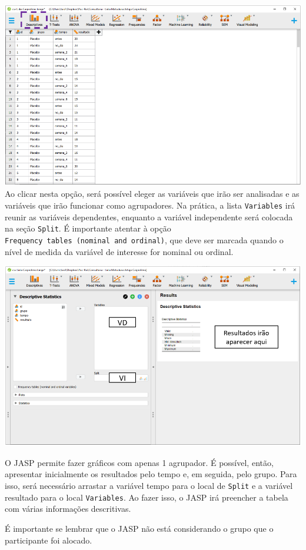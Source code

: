 \documentclass[
]{book}
\begin{document}
\includegraphics{./img/cap_lmm_descriptives.png} Ao clicar nesta opção,
será possível eleger as variáveis que irão ser analisadas e as variáveis
que irão funcionar como agrupadores. Na prática, a lista
\texttt{Variables} irá reunir as variáveis dependentes, enquanto a
variável independente será colocada na seção \texttt{Split}. É
importante atentar à opção
\texttt{Frequency\ tables\ (nominal\ and\ ordinal)}, que deve ser
marcada quando o nível de medida da variável de interesse for nominal ou
ordinal.

\includegraphics{./img/cap_lmm_descriptives2.png}

O JASP permite fazer gráficos com apenas 1 agrupador. É possível, então,
apresentar inicialmente os resultados pelo tempo e, em seguida, pelo
grupo. Para isso, será necessário arrastar a variável tempo para o local
de \texttt{Split} e a variável resultado para o local
\texttt{Variables}. Ao fazer isso, o JASP irá preencher a tabela com
várias informações descritivas.

É importante se lembrar que o JASP não está considerando o grupo que o
participante foi alocado.
\end{document}
